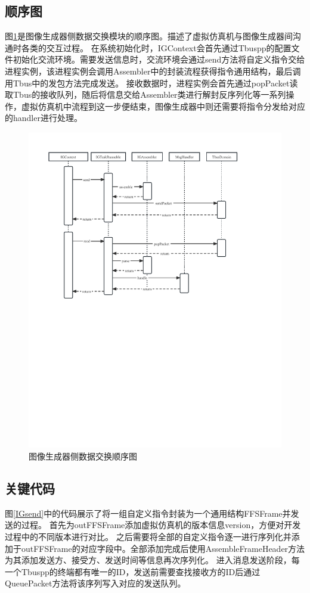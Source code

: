 \subsection{顺序图}
图\ref{seq3}是图像生成器侧数据交换模块的顺序图。描述了虚拟仿真机与图像生成器间沟通时各类的交互过程。
在系统初始化时，IGContext会首先通过Tbuspp的配置文件初始化交流环境。需要发送信息时，交流环境会通过send方法将自定义指令交给进程实例，该进程实例会调用Assembler中的封装流程获得指令通用结构，最后调用Tbus中的发包方法完成发送。
接收数据时，进程实例会首先通过popPacket读取Tbus的接收队列，随后将信息交给Assembler类进行解封反序列化等一系列操作，虚拟仿真机中流程到这一步便结束，图像生成器中则还需要将指令分发给对应的handler进行处理。
\begin{figure}[h!]
    \begin{center}
        \includegraphics[width=\textwidth]{pictures/sequence3.pdf}
        \caption{图像生成器侧数据交换顺序图}
        \label{seq3}
    \end{center}
\end{figure}
\subsection{关键代码}
图\ref{IGsend}中的代码展示了将一组自定义指令封装为一个通用结构FFSFrame并发送的过程。
首先为outFFSFrame添加虚拟仿真机的版本信息version，方便对开发过程中的不同版本进行对比。
之后需要将全部的自定义指令逐一进行序列化并添加于outFFSFrame的对应字段中。全部添加完成后使用AssembleFrameHeader方法为其添加发送方、接受方、发送时间等信息再次序列化。
进入消息发送阶段，每一个Tbuspp的终端都有唯一的ID，发送前需要查找接收方的ID后通过QueuePacket方法将该序列写入对应的发送队列。

